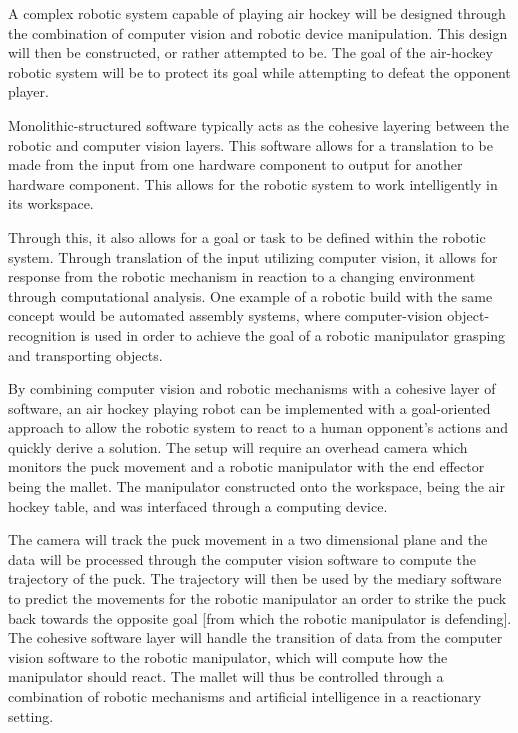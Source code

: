 \documentclass[letterpaper, 12 pt, conference]{ieeeconf}
\begin{document}
A complex robotic system capable of playing air hockey will be designed through the combination of computer vision and robotic device manipulation.  This design will then be constructed, or rather attempted to be.  The goal of the air-hockey robotic system will be to protect its goal while attempting to defeat the opponent player.

Monolithic-structured software typically acts as the cohesive layering between the robotic and computer vision layers.  This software allows for a translation to be made from the input from one hardware component to output for another hardware component.  This allows for the robotic system to work intelligently in its workspace. 

Through this, it also allows for a goal or task to be defined within the robotic system.  Through translation of the input utilizing computer vision, it allows for response from the robotic mechanism in reaction to a changing environment through computational analysis.  One example of a robotic build with the same concept would be automated assembly systems, where computer-vision object-recognition is used in order to achieve the goal of a robotic manipulator grasping and transporting objects.

By combining computer vision and robotic mechanisms with a cohesive layer of software, an air hockey playing robot can be implemented with a goal-oriented approach to allow the robotic system to react to a human opponent’s actions and quickly derive a solution. The setup will require an overhead camera which monitors the puck movement and a robotic manipulator with the end effector being the mallet. The manipulator constructed onto the workspace, being the air hockey table, and was interfaced through a computing device.

The camera will track the puck movement in a two dimensional plane and the data will be processed through the computer vision software to compute the trajectory of the puck.  The trajectory will then be used by the mediary software to predict the movements for the robotic manipulator an order to strike the puck back towards the opposite goal [from which the robotic manipulator is defending].  The cohesive software layer will handle the transition of data from the computer vision software to the robotic manipulator, which will compute how the manipulator should react. The mallet will thus be controlled through a combination of robotic mechanisms and artificial intelligence in a reactionary setting.
\end{document}
